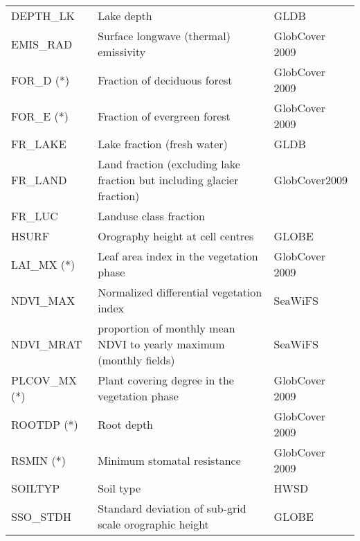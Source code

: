 \begin{longtable}{p{2.5cm}p{8.5cm}p{3.3cm}}
  DEPTH\_LK                             & Lake depth                                      &        GLDB               \\
  EMIS\_RAD                             & Surface longwave (thermal) emissivity           &        GlobCover 2009     \\               
  FOR\_D  (*)                           & Fraction of deciduous forest                    &        GlobCover 2009     \\
  FOR\_E  (*)                           & Fraction of evergreen forest                    &        GlobCover 2009     \\
  FR\_LAKE                              & Lake fraction (fresh water)                     &        GLDB               \\                     
  FR\_LAND                              & Land fraction (excluding lake fraction but including glacier fraction) & GlobCover2009   \\
  FR\_LUC                               & Landuse class fraction                          &                           \\
  HSURF                                 & Orography height at cell centres                &        GLOBE              \\
  LAI\_MX  (*)                          & Leaf area index in the vegetation phase         &        GlobCover 2009     \\
  NDVI\_MAX                             & Normalized differential vegetation index        &        SeaWiFS            \\
  NDVI\_MRAT                            & proportion of monthly mean NDVI to yearly maximum (monthly fields)&  SeaWiFS \\
  PLCOV\_MX  (*)                        & Plant covering degree in the vegetation phase   &        GlobCover 2009     \\
  ROOTDP (*)                            & Root depth                                      &        GlobCover 2009     \\
  RSMIN  (*)                            & Minimum stomatal resistance                     &        GlobCover 2009     \\
  SOILTYP                               & Soil type                                       &        HWSD               \\
  SSO\_STDH                             & Standard deviation of sub-grid scale orographic height  &   GLOBE           \\

\end{longtable}
